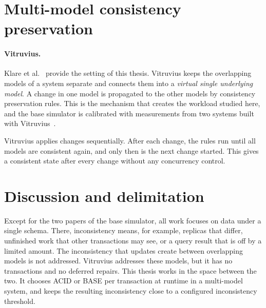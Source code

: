 \section{Multi-model consistency preservation}\label{sec:rw-multimodel}

\paragraph{Vitruvius.} Klare et al.~\cite{klare2021vitruvius} provide the
setting of this thesis. Vitruvius keeps the overlapping models of a system
separate and connects them into a \emph{virtual single underlying model}. A
change in one model is propagated to the other models by consistency
preservation rules. This is the mechanism that creates the workload studied
here, and the base simulator is calibrated with measurements from two systems
built with Vitruvius~\cite{zacouris2026mxs}.

Vitruvius applies changes sequentially. After each change, the rules run until
all models are consistent again, and only then is the next change started. This
gives a consistent state after every change without any concurrency control.

\section{Discussion and delimitation}\label{sec:rw-gap}

Except for the two papers of the base simulator, all work focuses on data under a single schema. There, inconsistency means, for example,
replicas that differ, unfinished work that other transactions may see, or a
query result that is off by a limited amount. The inconsistency that updates create
between overlapping models is not addressed. Vitruvius addresses these models,
but it has no transactions and no deferred repairs. This thesis works in the
space between the two. It chooses ACID or BASE per transaction at runtime in a
multi-model system, and keeps the resulting inconsistency close to a configured inconsistency
threshold.
